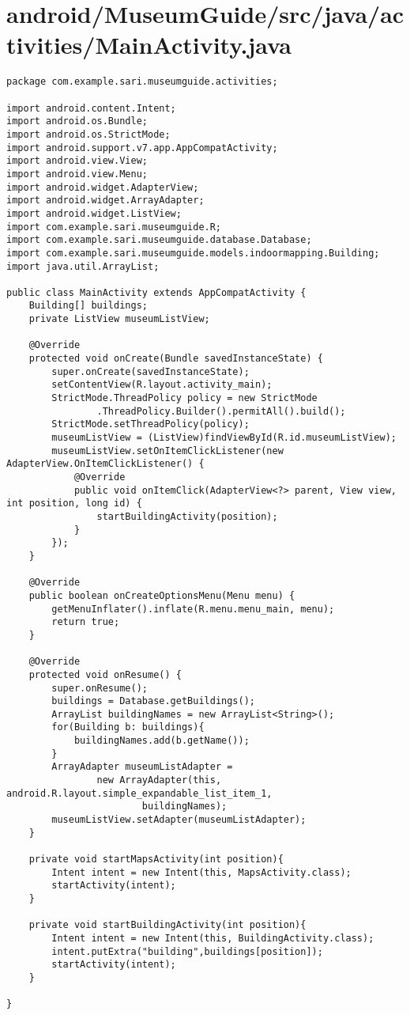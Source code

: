 \section{android/MuseumGuide/src/java/activities/MainActivity.java}
\begin{lstlisting}package com.example.sari.museumguide.activities;

import android.content.Intent;
import android.os.Bundle;
import android.os.StrictMode;
import android.support.v7.app.AppCompatActivity;
import android.view.View;
import android.view.Menu;
import android.widget.AdapterView;
import android.widget.ArrayAdapter;
import android.widget.ListView;
import com.example.sari.museumguide.R;
import com.example.sari.museumguide.database.Database;
import com.example.sari.museumguide.models.indoormapping.Building;
import java.util.ArrayList;

public class MainActivity extends AppCompatActivity {
    Building[] buildings;
    private ListView museumListView;

    @Override
    protected void onCreate(Bundle savedInstanceState) {
        super.onCreate(savedInstanceState);
        setContentView(R.layout.activity_main);
        StrictMode.ThreadPolicy policy = new StrictMode
                .ThreadPolicy.Builder().permitAll().build();
        StrictMode.setThreadPolicy(policy);
        museumListView = (ListView)findViewById(R.id.museumListView);
        museumListView.setOnItemClickListener(new AdapterView.OnItemClickListener() {
            @Override
            public void onItemClick(AdapterView<?> parent, View view, int position, long id) {
                startBuildingActivity(position);
            }
        });
    }

    @Override
    public boolean onCreateOptionsMenu(Menu menu) {
        getMenuInflater().inflate(R.menu.menu_main, menu);
        return true;
    }

    @Override
    protected void onResume() {
        super.onResume();
        buildings = Database.getBuildings();
        ArrayList buildingNames = new ArrayList<String>();
        for(Building b: buildings){
            buildingNames.add(b.getName());
        }
        ArrayAdapter museumListAdapter =
                new ArrayAdapter(this, android.R.layout.simple_expandable_list_item_1,
                        buildingNames);
        museumListView.setAdapter(museumListAdapter);
    }

    private void startMapsActivity(int position){
        Intent intent = new Intent(this, MapsActivity.class);
        startActivity(intent);
    }

    private void startBuildingActivity(int position){
        Intent intent = new Intent(this, BuildingActivity.class);
        intent.putExtra("building",buildings[position]);
        startActivity(intent);
    }

}
\end{lstlisting}
\newpage
